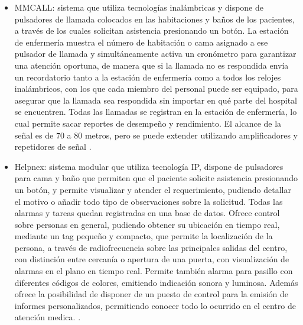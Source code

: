 \begin{itemize}
\item MMCALL: sistema que utiliza tecnologías inalámbricas y dispone de pulsadores de llamada colocados en las habitaciones y baños de los pacientes, a través de los cuales solicitan asistencia presionando un botón. La estación de enfermería muestra el número de habitación o cama asignado a ese pulsador de llamada y simultáneamente activa un cronómetro para garantizar una atención oportuna, de manera que si la llamada no es respondida envía un recordatorio tanto a la estación de enfermería como a todos los relojes inalámbricos, con los que cada miembro del personal puede ser equipado, para asegurar que la llamada sea respondida sin importar en qué parte del hospital se encuentren. Todas las llamadas se registran en la estación de enfermería, lo cual permite sacar reportes de desempeño y rendimiento. El alcance de la señal es de 70 a 80 metros, pero se puede extender utilizando amplificadores y repetidores de señal \cite{mmcall}.	

\item Helpnex: sistema modular que utiliza tecnología IP, dispone de pulsadores para cama y baño que permiten que el paciente solicite asistencia presionando un botón, y permite visualizar y atender el requerimiento, pudiendo detallar el motivo o añadir todo tipo de observaciones sobre la solicitud. Todas las alarmas y tareas quedan registradas en una base de datos. Ofrece control sobre personas en general, pudiendo obtener su ubicación en tiempo real, mediante un tag pequeño y compacto, que permite la localización de la persona, a través de radiofrecuencia sobre las principales salidas del centro, con distinción entre cercanía o apertura de una puerta, con visualización de alarmas en el plano en tiempo real. Permite también alarma para pasillo con diferentes códigos de colores, emitiendo indicación sonora y luminosa. Además ofrece la posibilidad de disponer de un puesto de control para la emisión de informes personalizados, permitiendo conocer todo lo ocurrido en el centro de atención medica. \cite{helpnex}.


\end{itemize}
